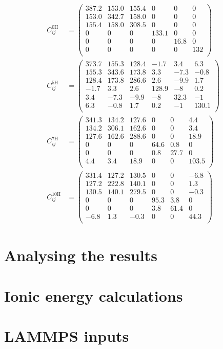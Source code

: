 \begin{align*}
C_{ij}^{\text{0H}} &= \begin{pmatrix}
387.2 & 153.0 & 155.4 & 0     & 0    & 0 \\
153.0 & 342.7 & 158.0 & 0     & 0    & 0 \\
155.4 & 158.0 & 308.5 & 0     & 0    & 0 \\
0     & 0     & 0     & 133.1 & 0    & 0 \\
0     & 0     & 0     & 0     & 16.8 & 0 \\
0     & 0     & 0     & 0     & 0    & 132 \\
\end{pmatrix} \\
C_{ij}^{\text{5H}} &= \begin{pmatrix}
373.7 & 155.3 & 128.4 & -1.7 & 3.4 & 6.3 \\
155.3 & 343.6 & 173.8 & 3.3 & -7.3 & -0.8 \\
128.4 & 173.8 & 286.6 & 2.6 & -9.9 & 1.7 \\
-1.7 & 3.3 & 2.6 & 128.9 & -8 & 0.2 \\
3.4 & -7.3 & -9.9 & -8 & 32.3 & -1 \\
6.3 & -0.8 & 1.7 & 0.2 & -1 & 130.1 \\
\end{pmatrix} \\
C_{ij}^{\text{7H}} &= \begin{pmatrix}
341.3 & 134.2 & 127.6 & 0 & 0 & 4.4 \\
134.2 & 306.1 & 162.6 & 0 & 0 & 3.4 \\
127.6 & 162.6 & 288.6 & 0 & 0 & 18.9 \\
0 & 0 & 0 & 64.6 & 0.8 & 0 \\
0 & 0 & 0 & 0.8 & 27.7 & 0 \\
4.4 & 3.4 & 18.9 & 0 & 0 & 103.5 \\
\end{pmatrix} \\
C_{ij}^{\text{10H}} &= \begin{pmatrix}
331.4 & 127.2 & 130.5 & 0 & 0 & -6.8 \\
127.2 & 222.8 & 140.1 & 0 & 0 & 1.3 \\
130.5 & 140.1 & 279.5 & 0 & 0 & -0.3 \\
0 & 0 & 0 & 95.3 & 3.8 & 0 \\
0 & 0 & 0 & 3.8 & 61.4 & 0 \\
-6.8 & 1.3 & -0.3 & 0 & 0 & 44.3 \\
\end{pmatrix}
\end{align*}

\section{Analysing the results}
\label{sec:analysing_results_code}

\section{Ionic energy calculations}
\label{sec:ionic_energy_code}
%


\section{LAMMPS inputs}
\label{sec:lammps_input}
